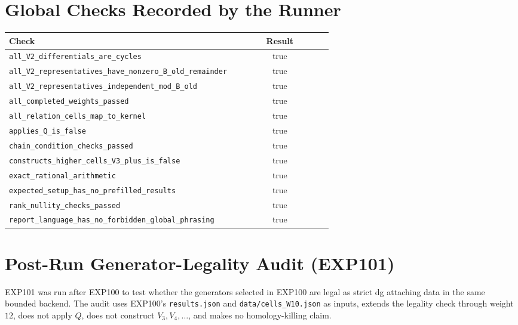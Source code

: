 \documentclass[11pt]{article}
\begin{document}
\section*{Global Checks Recorded by the Runner}

\begin{center}
\begin{tabular}{L{0.70\linewidth}c}
\toprule
Check & Result \\
\midrule
\texttt{all\_V2\_differentials\_are\_cycles} & true \\
\texttt{all\_V2\_representatives\_have\_nonzero\_B\_old\_remainder} & true \\
\texttt{all\_V2\_representatives\_independent\_mod\_B\_old} & true \\
\texttt{all\_completed\_weights\_passed} & true \\
\texttt{all\_relation\_cells\_map\_to\_kernel} & true \\
\texttt{applies\_Q\_is\_false} & true \\
\texttt{chain\_condition\_checks\_passed} & true \\
\texttt{constructs\_higher\_cells\_V3\_plus\_is\_false} & true \\
\texttt{exact\_rational\_arithmetic} & true \\
\texttt{expected\_setup\_has\_no\_prefilled\_results} & true \\
\texttt{rank\_nullity\_checks\_passed} & true \\
\texttt{report\_language\_has\_no\_forbidden\_global\_phrasing} & true \\
\bottomrule
\end{tabular}
\end{center}

\section*{Post-Run Generator-Legality Audit (EXP101)}

EXP101 was run after EXP100 to test whether the generators selected in EXP100
are legal as strict dg attaching data in the same bounded backend.  The audit
uses EXP100's \texttt{results.json} and \texttt{data/cells\_W10.json} as
inputs, extends the legality check through weight \(12\), does not apply \(Q\),
does not construct \(V_3,V_4,\ldots\), and makes no homology-killing claim.
\end{document}

